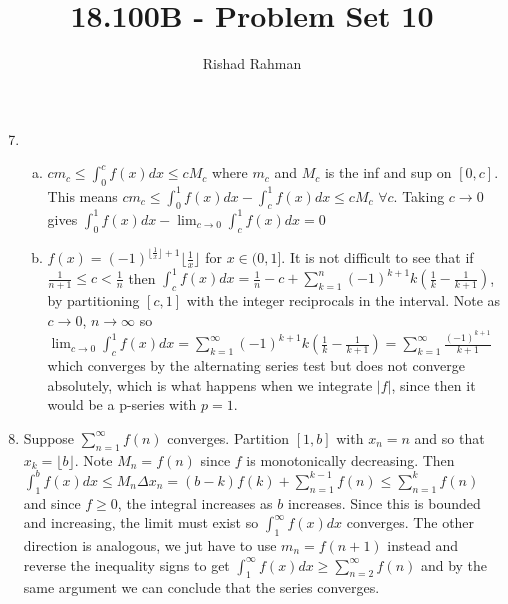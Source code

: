 \documentclass{article}
\begin{document}
\setlength{\abovedisplayskip}{0pt}
\setlength{\belowdisplayskip}{0pt}
\setlength{\abovedisplayshortskip}{0pt}
\setlength{\belowdisplayshortskip}{0pt}
\title{18.100B - Problem Set 10}
\author{Rishad Rahman}
\date{}
\maketitle
\begin{enumerate}
\setcounter{enumi}{6}
\item
\begin{enumerate}[(a)]
\item $\displaystyle cm_c\leq \int_{0}^{c} f(x) dx \leq cM_c$ where $m_c$ and $M_c$ is the inf and sup on $[0, c]$. This means $\displaystyle cm_c\leq \int_{0}^{1} f(x) dx - \int_{c}^{1} f(x) dx\leq cM_c$ $\forall c$. Taking $c\rightarrow 0$ gives $\displaystyle\int_{0}^{1} f(x) dx - \lim_{c\rightarrow 0} \int_{c}^{1} f(x) dx=0$\\
\item $f(x) = (-1)^{\lfloor \frac{1}{x} \rfloor + 1} \lfloor \frac{1}{x}\rfloor$ for $x\in (0, 1]$. It is not difficult to see that if $\displaystyle \frac{1}{n+1} \leq c < \frac{1}{n}$ then $\displaystyle \int_{c}^{1} f(x) dx = \frac{1}{n}- c + \sum_{k=1}^{n} (-1)^{k+1} k\left(\frac{1}{k}-\frac{1}{k+1}\right)$, by partitioning $[c, 1]$ with the integer reciprocals in the interval. Note as $c\rightarrow 0$, $n\rightarrow\infty$ so $\displaystyle \lim_{c\rightarrow 0} \int_{c}^{1} f(x) dx = \sum_{k=1}^{\infty} (-1)^{k+1} k\left(\frac{1}{k}-\frac{1}{k+1}\right) = \sum_{k=1}^{\infty} \frac{(-1)^{k+1}}{k+1}$ which converges by the alternating series test but does not converge absolutely, which is what happens when we integrate $|f|$, since then it would be a p-series with $p=1$. 
\end{enumerate}
\item Suppose $\displaystyle\sum_{n=1}^{\infty} f(n)$ converges. Partition $[1, b]$ with $x_n= n$ and so that $x_k =\lfloor b\rfloor$. Note $M_n = f(n)$ since $f$ is monotonically decreasing. Then $\displaystyle\int_{1}^{b} f(x) dx \leq M_n \Delta x_n = (b-k)f(k) + \displaystyle\sum_{n=1}^{k-1} f(n)\leq \displaystyle\sum_{n=1}^{k} f(n)$ and since $f\geq 0$, the integral increases as $b$ increases. Since this is bounded and increasing, the limit must exist so $\displaystyle\int_{1}^{\infty} f(x) dx$ converges. The other direction is analogous, we jut have to use $m_n = f(n+1)$ instead and reverse the inequality signs to get $\displaystyle\int_{1}^{\infty} f(x) dx \geq \displaystyle\sum_{n=2}^{\infty} f(n)$ and by the same argument we can conclude that the series converges. \\

\end{enumerate}
\end{document}

